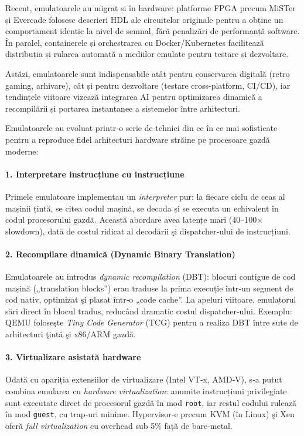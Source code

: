 \documentclass[titlepage,12pt]{article}
\begin{document}
Recent, emulatoarele au migrat și în hardware: platforme FPGA precum MiSTer și Evercade folosesc descrieri HDL ale circuitelor originale pentru a obține un comportament identic la nivel de semnal, fără penalizări de performanță software. În paralel, containerele și orchestrarea cu Docker/Kubernetes facilitează distribuția și rularea automată a mediilor emulate pentru testare și dezvoltare.

Astăzi, emulatoarele sunt indispensabile atât pentru conservarea digitală (retro gaming, arhivare), cât și pentru dezvoltare (testare cross-platform, CI/CD), iar tendințele viitoare vizează integrarea AI pentru optimizarea dinamică a recompilării și portarea instantanee a sistemelor între arhitecturi.

Emulatoarele au evoluat printr‑o serie de tehnici din ce în ce mai sofisticate pentru a reproduce fidel arhitecturi hardware străine pe procesoare gazdă moderne:

\paragraph{1. Interpretare instrucțiune cu instrucțiune}  
Primele emulatoare implementau un \emph{interpreter} pur: la fiecare ciclu de ceas al mașinii țintă, se citea codul mașină, se decoda și se executa un echivalent în codul procesorului gazdă. Această abordare avea latențe mari (40–100× slowdown), dată de costul ridicat al decodării şi dispatcher‑ului de instrucțiuni.

\paragraph{2. Recompilare dinamică (Dynamic Binary Translation)}  
Emulatoarele au introdus \emph{dynamic recompilation} (DBT): blocuri contigue de cod mașină („translation blocks”) erau traduse la prima execuție într‑un segment de cod nativ, optimizat şi plasat într‑o „code cache”. La apeluri viitoare, emulatorul sări direct în blocul tradus, reducând dramatic costul dispatcher‑ului. Exemplu: QEMU foloseşte \emph{Tiny Code Generator} (TCG) pentru a realiza DBT între sute de arhitecturi ţintă şi x86/\-ARM gazdă.

\paragraph{3. Virtualizare asistată hardware}  
Odată cu apariția extensiilor de virtualizare (Intel VT‑x, AMD‑V), s‑a putut combina emularea cu \emph{hardware virtualization}: anumite instrucțiuni privilegiate sunt executate direct de procesorul gazdă în mod \texttt{root}, iar restul codului rulează în mod \texttt{guest}, cu trap‑uri minime. Hypervisor‑e precum KVM (în Linux) şi Xen oferă \emph{full virtualization} cu overhead sub 5\% față de bare‑metal.
\end{document}
